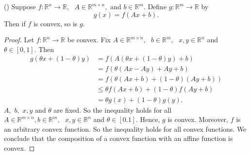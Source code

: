 \begin{proposition}\label{compaf}
\textnormal{(\cite[79]{boyd2004convex})}
Suppose $f: \mathbb{R}^{n} \longrightarrow \mathbb{R}, \text{ } A \in \mathbb{R}^{m\times n},$ and $b \in \mathbb{R}^{m}.$ Define $g: \mathbb{R}^{m} \longrightarrow \mathbb{R}$ by $$g(x)=f(Ax+b).$$ Then if $f$ is convex, so is $g$.
\end{proposition}
\begin{proof}
Let $f: \mathbb{R}^{n} \longrightarrow \mathbb{R}$ be convex. Fix $A \in \mathbb{R}^{m\times n}, \text{ }b \in \mathbb{R}^{m}, \text{ }x,y \in \mathbb{R}^{n}$ and $\theta \in [0,1].$ Then
\begin{align*}
g(\theta x + (1-\theta)y) &= f(A(\theta x + (1-\theta)y) + b)\\
&= f(\theta(Ax - Ay) + Ay + b)\\
&= f(\theta(Ax + b) + (1 - \theta)(Ay+b))\\
&\leq \theta f(Ax + b) + (1-\theta) f(Ay + b)\\
&= \theta g(x) + (1-\theta)g(y).
\end{align*}
$A,$ $b,$ $x,y$ and $\theta$ are fixed. So the inequality holds for all $A \in \mathbb{R}^{m\times n}, b \in \mathbb{R}^{m}, \text{ } x,y \in \mathbb{R}^{n}$ and $\theta \in [0.1].$ Hence, $g$ is convex. Moreover, $f$ is an arbitrary convex function. So the inequality holds for all convex functions. We conclude that the composition of a convex function with an affine function is convex.
\end{proof}
